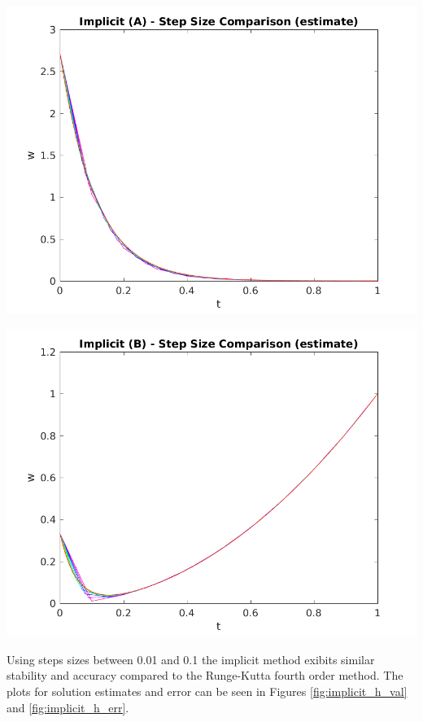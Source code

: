 \documentclass{article}
\begin{document}
\begin{center}
	\centering
    \begin{minipage}{0.5\textwidth}
        \centering
	    \includegraphics[width=1\textwidth]{../output/a_implicit_h_val.png}
    \end{minipage}\hfill
    \begin{minipage}{0.5\textwidth}
        \centering
	    \includegraphics[width=1\textwidth]{../output/b_implicit_h_val.png}
    \end{minipage}
 	\label{fig:implicit_h_val}
\end{center}

Using steps sizes between 0.01 and 0.1 the implicit method exibits similar stability and accuracy compared to the Runge-Kutta fourth order method. The plots for solution estimates and error can be seen in Figures \ref{fig:implicit_h_val} and \ref{fig:implicit_h_err}.
\end{document}
